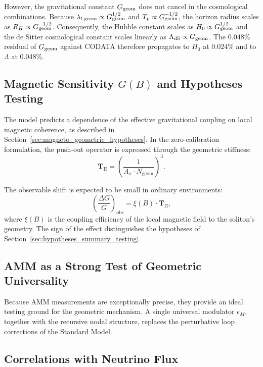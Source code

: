 \documentclass[10pt,a4paper]{article}
\begin{document}
However, the gravitational constant \(G_{\rm geom}\) does not cancel in the cosmological combinations. Because \(\lambda_{l,\text{geom}} \propto G_{\rm geom}^{1/2}\) and \(T_p \propto G_{\rm geom}^{-1/2}\), the horizon radius scales as \(R_H \propto G_{\rm geom}^{-1/2}\). Consequently, the Hubble constant scales as \(H_0 \propto G_{\rm geom}^{1/2}\) and the de Sitter cosmological constant scales linearly as \(\Lambda_{\rm dS} \propto G_{\rm geom}\). The \(0.048\%\) residual of \(G_{\rm geom}\) against CODATA therefore propagates to \(H_0\) at \(0.024\%\) and to \(\Lambda\) at \(0.048\%\).

\subsection{Magnetic Sensitivity \(G(B)\) and Hypotheses Testing}
\label{sec:G_magnetic_sensitivity_pp}

The model predicts a dependence of the effective gravitational coupling on local magnetic coherence, as described in Section~\ref{sec:magneto_geometric_hypotheses}. In the zero-calibration formulation, the push-out operator is expressed through the geometric stiffness:
\begin{equation}
	\mathbf{T}_{\text{II}}
	=
	\left(
	\frac{1}{A_\pi \cdot N_{\text{geom}}}
	\right)^3 .
\end{equation}

The observable shift is expected to be small in ordinary environments:
\begin{equation}
	\left( \frac{\Delta G}{G} \right)_{\text{obs}}
	=
	\xi(B) \cdot \mathbf{T}_{\text{II}},
\end{equation}
where \(\xi(B)\) is the coupling efficiency of the local magnetic field to the soliton's geometry. The sign of the effect distinguishes the hypotheses of Section~\ref{sec:hypotheses_summary_testing}.

\subsection{AMM as a Strong Test of Geometric Universality}
\label{sec:amm_strong_test}

Because AMM measurements are exceptionally precise, they provide an ideal testing ground for the geometric mechanism. A single universal modulator \(\epsilon_M\), together with the recursive nodal structure, replaces the perturbative loop corrections of the Standard Model.

\subsection{Correlations with Neutrino Flux}
\label{sec:neutrino_correlations_pp}
\end{document}
